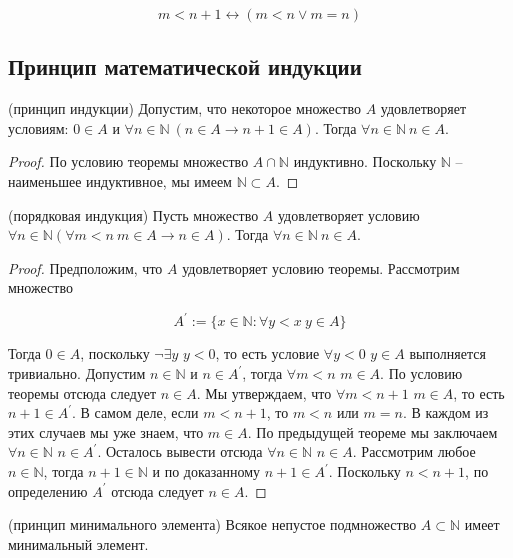 {$$m<n+1 \leftrightarrow(m<n \vee m=n)$$

\subsection{Принцип математической индукции}

\begin{theorem}
	(принцип индукции) Допустим, что некоторое множество $A$ удовлетворяет условиям: $0 \in A$ и $\forall n \in
	\mathbb{N} \ (n \in A \rightarrow n+1 \in A)$. Тогда $\forall n \in \mathbb{N} \ n \in A$.
\end{theorem}

\begin{proof}{По условию теоремы множество $A \cap \mathbb{N}$ индуктивно. Поскольку $\mathbb{N}$ -- наименьшее
	индуктивное, мы имеем $\mathbb{N} \subset A$.}
\end{proof}

\begin{theorem}
	(порядковая индукция) Пусть множество $A$ удовлетворяет условию $\forall n \in \mathbb{N}(\forall m<n \ m \in A
	\rightarrow n \in A)$. Тогда $\forall n \in \mathbb{N} \ n \in A$.
\end{theorem}

\begin{proof}{Предположим, что $A$ удовлетворяет условию теоремы. Рассмотрим множество

	$$A^{\prime}:=\{x \in \mathbb{N}: \forall y<x \ y \in A\}$$

	Тогда $0 \in A$, поскольку $\neg \exists y$ $y<0$, то есть условие $\forall y<0$ $y \in A$ выполняется
	тривиально. Допустим $n \in \mathbb{N}$ и $n \in A^{\prime}$, тогда $\forall m<n$ $m \in A$. По условию теоремы
	отсюда следует $n \in A$. Мы утверждаем, что $\forall m < n + 1$ $m \in A$, то есть $n+1 \in A^\prime$. В самом
	деле, если $m < n + 1$, то $ m < n$ или $ m = n$. В каждом из этих случаев мы уже знаем, что $m \in A$. По
	предыдущей теореме мы заключаем $\forall n \in \mathbb{N}$ $n \in A^{\prime}$. Осталось вывести отсюда $\forall
	n \in \mathbb{N}$ $n \in A$. Рассмотрим любое $n \in \mathbb{N}$, тогда $n + 1 \in \mathbb{N}$ и по доказанному
	$n + 1 \in A^{\prime}$. Поскольку $n < n + 1$, по определению $A^\prime$ отсюда следует $n \in A$.}
\end{proof}

\begin{theorem}
	(принцип минимального элемента) Всякое непустое подмножество $A \subset \mathbb{N}$ имеет минимальный элемент.
\end{theorem}

}

